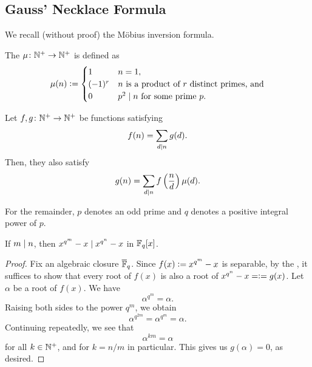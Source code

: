 \subsection{Gauss' Necklace Formula}

We recall (without proof) the Möbius inversion formula.

\begin{defn}
    The  $\mu \colon \mathbb{N}^+ \to \mathbb{N}^+$ is defined as
    \[
        \mu(n) \vcentcolon= \begin{cases}
            1 & n = 1, \\
            (-1)^r & \text{$n$ is a product of $r$ distinct primes, and} \\
            0 & p^2 \mid n \text{ for some prime $p$.}
        \end{cases}
    \]
\end{defn}
\begin{theorem} \label{thm:möbius}
    Let $f,g \colon \mathbb{N}^+ \to \mathbb{N}^+$ be functions satisfying 
    \[
        f(n) = \sum_{d \mid n} g(d).
    \]
    Then, they also satisfy
    \[
        g(n) = \sum_{d \mid n} f\left( \frac{n}{d} \right) \mu(d).
    \]
\end{theorem}

For the remainder, $p$ denotes an odd prime and $q$ denotes a positive integral power of $p$.

\begin{lem} \label{lem:finite-field-polynomial-division}
    If $m \mid n$, then $x^{q^m} - x \mid x^{q^n} - x$ in $\mathbb{F}_q[x]$.
\end{lem}
\begin{proof}
    Fix an algebraic closure $\overline{\mathbb{F}}_q$. Since $f(x) \vcentcolon= x^{q^m} - x$ is separable, by the , it suffices to show that every root of $f(x)$ is also a root of $x^{q^n} - x =\vcentcolon= g(x)$. Let $\alpha$ be a root of $f(x)$. We have
    \[
        \alpha^{q^m} = \alpha.
    \]
    Raising both sides to the power $q^m$, we obtain
    \[
        \alpha^{q^{2m}} = \alpha^{q^m} = \alpha.
    \]
    Continuing repeatedly, we see that
    \[
        \alpha^{km} = \alpha
    \]
    for all $k \in \mathbb{N}^+$, and for $k = n/m$ in particular. This gives us $g(\alpha) = 0$, as desired.
\end{proof}

